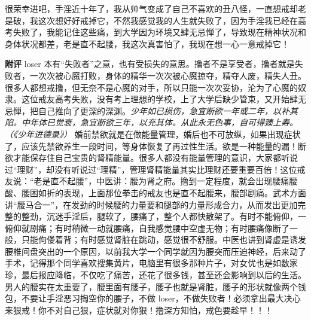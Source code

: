 \begin{case}
    很荣幸进吧，手淫近十年了，我从帅气变成了自己不喜欢的丑八怪，一直想戒却老是破，我这次想好好戒掉它，不然我感觉我的人生就失败了，因为手淫我已经在高考失败了，我能记住这些痛，到大学因为环境又肆无忌惮了，导致现在精神状况和身体状况都差，老是直不起腰，我这次真害怕了，我现在想一心一意戒掉它！

    \textbf{附评} loser 本有“失败者”之意，也有受损失的意思。撸者不是享受者，撸者就是失败者，一次次被心魔打败，身体的精华一次次被心魔掠夺，精夺人废，精失人丑。很多人都想戒撸，但无奈不是心魔的对手，所以只能一次次妥协，沦为了心魔的奴隶。这位戒友高考失败，没有考上理想的学校，上了大学后缺少管束，又开始肆无忌惮，把自己推向了更深的深渊。\textit{少年如已损伤，急宜断欲一年或二年，以补其陷。中年体已觉衰，急宜断欲三年，以充其体。从此永无色事，自可得臻上寿。（《少年进德录》）} 婚前禁欲就是在做能量管理，婚后也不可放纵，如果出现症状了，应该先禁欲养生一段时间，等身体恢复了再过性生活。欲是一种能量的漏！断欲才能保存住自己宝贵的肾精能量。很多人都没有能量管理的意识，大家都听说过“理财”，却没有听说过“理精”，管理肾精能量其实比理财还要重要百倍！这位戒友说：“老是直不起腰”，中医讲：腰为肾之府。撸到一定程度，就会出现腰痛腰酸、腰困如折的表现，上面那位拳击的戒友也是直不起腰来，腰部剧痛。武术方面讲“腰马合一”，在发劲的时候腰的力量要和腿部的力量形成合力，从而发出更加完整的整劲，沉迷手淫后，腿软了，腰痛了，整个人都快散架了。有时不能俯仰，一俯仰就剧痛；有时稍微一动就腰痛，自我感觉腰中空虚无物；有时腰痛像断了一般，只能佝偻着背；有时感觉肾脏在跳动，感觉很不舒服。中医也讲到肾虚是诱发腰椎间盘突出的一个原因，以前我大学一个同学就因为腰突而压迫神经，后来动了手术，记得那个同学喜欢搜集黄片，电脑里有很多那种片子，对女优也是如数家珍，最后报应降临，不仅吃了痛苦，还花了很多钱，甚至还会影响到以后的生活。男人的腰实在太重要了，腰里面有腰子，腰子也就是肾脏，腰子的形状就像两个钱包，不要让手淫恶习掏空你的腰子，不做 loser，不做失败者！必须拿出最大决心来狠戒！你不对自己狠，症状就对你狠！撸深方知怕，戒色要趁早！！！
\end{case}

